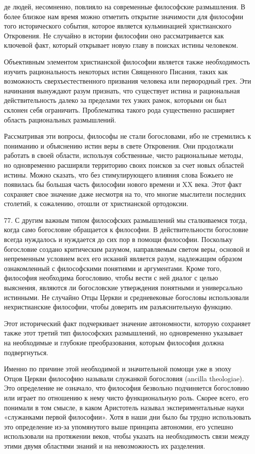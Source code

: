 \documentclass[a5paper,10pt]{article}
\begin{document}
де людей, несомненно, повлияло на современные философские размышления. В более
близкое нам время можно отметить открытие значимости для философии того
исторического события, которое является кульминацией христианского Откровения.
Не случайно в истории философии оно рассматривается как ключевой факт, который
открывает новую главу в поисках истины человеком.

Объективным элементом христианской философии является также необходимость
изучить рациональность некоторых истин Священного Писания, таких как
возможность сверхъестественного призвания человека или первородный грех. Эти
начинания вынуждают разум признать, что существует истина и рациональная
действительность далеко за пределами тех узких рамок, которыми он был склонен
себя ограничить. Проблематика такого рода существенно расширяет область
рациональных размышлений.

Рассматривая эти вопросы, философы не стали богословами, ибо не стремились к
пониманию и объяснению истин веры в свете Откровения. Они продолжали работать в
своей области, используя собственные, чисто рациональные методы, но
одновременно расширяли территорию своих поисков за счет новых областей истины.
Можно сказать, что без стимулирующего влияния слова Божьего не появилась бы
большая часть философии нового времени и XX века. Этот факт сохраняет свое
значение даже несмотря на то, что многие мыслители последних столетий, к
сожалению, отошли от христианской ортодоксии.

77. С другим важным типом философских размышлений мы сталкиваемся тогда, когда
само богословие обращается к философии. В действительности богословие всегда
нуждалось и нуждается до сих пор в помощи философии. Поскольку богословие
создано критическим разумом, направляемым светом веры, основой и непременным
условием всех его исканий является разум, надлежащим образом ознакомленный с
философскими понятиями и аргументами. Кроме того, философия необходима
богословию, чтобы вести с ней диалог с целью выяснения, являются ли
богословские утверждения понятными и универсально истинными. Не случайно Отцы
Церкви и средневековые богословы использовали нехристианские философии, чтобы
доверить им разъяснительную функцию.

Этот исторический факт подчеркивает значение автономности, которую сохраняет
также этот третий тип философских размышлений, но одновременно указывает на
необходимые и глубокие преобразования, которым философия должна подвергнуться.

Именно по причине этой необходимой и значительной помощи уже в эпоху Отцов
Церкви философию называли служанкой богословия (ancilla theologiae). Это
определение не означало, что философия безвольно подчиняется богословию или
играет по отношению к нему чисто функциональную роль. Скорее всего, его
понимали в том смысле, в каком Аристотель называл экспериментальные науки
«служанками первой философии». Хотя в наши дни было бы трудно использовать это
определение из-за упомянутого выше принципа автономии, его успешно использовали
на протяжении веков, чтобы указать на необходимость связи между этими двумя
областями знаний и на невозможность их разделения.
\end{document}
